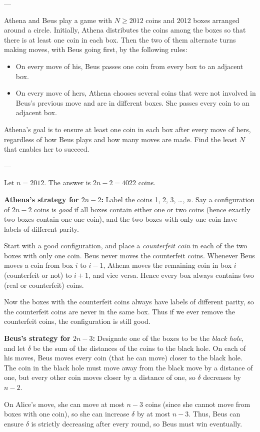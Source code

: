 
---

Athena and Beus play a game with $N\ge2012$ coins and 2012 boxes arranged around a circle. Initially, Athena distributes the coins among the boxes so that there is at least one coin in each box. Then the two of them alternate turns making moves, with Beus going first, by the following rules:
\begin{itemize}
    \item On every move of his, Beus passes one coin from every box to an adjacent box.
    \item On every move of hers, Athena chooses several coins that were not involved in Beus's previous move and are in different boxes. She passes every coin to an adjacent box.
\end{itemize}
Athena's goal is to ensure at least one coin in each box after every move of hers, regardless of how Beus plays and how many moves are made. Find the least $N$ that enables her to succeed.

---

Let $n=2012$. The answer is $2n-2=4022$ coins.

\bigskip

\textbf{Athena's strategy for $2n-2$:} Label the coins 1, 2, 3, \ldots, $n$. Say a configuration of $2n-2$ coins is \emph{good} if all boxes contain either one or two coins (hence exactly two boxes contain one one coin), and the two boxes with only one coin have labels of different parity.

Start with a good configuration, and place a \emph{counterfeit coin} in each of the two boxes with only one coin. Beus never moves the counterfeit coins. Whenever Beus moves a coin from box $i$ to $i-1$, Athena moves the remaining coin in box $i$ (counterfeit or not) to $i+1$, and vice versa. Hence every box always contains two (real or counterfeit) coins.

Now the boxes with the counterfeit coins always have labels of different parity, so the counterfeit coins are never in the same box. Thus if we ever remove the counterfeit coins, the configuration is still good.

\bigskip

\textbf{Beus's strategy for $2n-3$:} Designate one of the boxes to be the \emph{black hole}, and let $\delta$ be the sum of the distances of the coins to the black hole. On each of his moves, Beus moves every coin (that he can move) closer to the black hole. The coin in the black hole must move away from the black move by a distance of one, but every other coin moves closer by a distance of one, so $\delta$ decreases by $n-2$.

On Alice's move, she can move at most $n-3$ coins (since she cannot move from boxes with one coin), so she can increase $\delta$ by at most $n-3$. Thus, Beus can ensure $\delta$ is strictly decreasing after every round, so Beus must win eventually.

